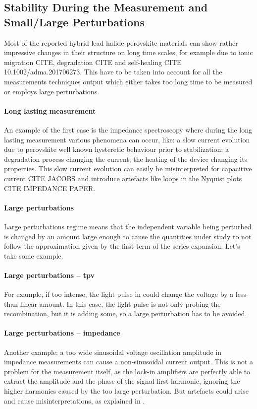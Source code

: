 \subsection{Stability During the Measurement and Small/Large Perturbations}

Most of the reported hybrid lead halide perovskite materials can show rather impressive changes in their structure on long time scales, for example due to ionic migration CITE, degradation CITE and self-healing CITE 10.1002/adma.201706273.
This have to be taken into account for all the measurements techniques output which either takes too long time to be measured or employs large perturbations.

\paragraph{Long lasting measurement} An example of the first case is the impedance spectroscopy where during the long lasting measurement various phenomena can occur, like: a slow current evolution due to perovskite well known hysteretic behaviour prior to stabilization; a degradation process changing the current; the heating of the device changing its properties. This slow current evolution can easily be misinterpreted for capacitive current CITE JACOBS and introduce artefacts like loops in the Nyquist plots CITE IMPEDANCE PAPER.

\paragraph{Large perturbations} Large perturbations regime means that the independent variable being perturbed is changed by an amount large enough to cause the quantities under study to not follow the approximation given by the first term of the series expansion. Let's take some example.

\paragraph{Large perturbations -- \gls{tpv}} For example, if too intense, the light pulse in  could change the voltage by a less-than-linear amount. In this case, the light pulse is not only probing the recombination, but it is adding some, so a large perturbation has to be avoided.

\paragraph{Large perturbations -- impedance} Another example: a too wide sinusoidal voltage oscillation amplitude in impedance measurements can cause a non-sinusoidal current output. This is not a problem for the measurement itself, as the lock-in amplifiers are perfectly able to extract the amplitude and the phase of the signal first harmonic, ignoring the higher harmonics caused by the too large perturbation. But artefacts could arise and cause misinterpretations, as explained in .

